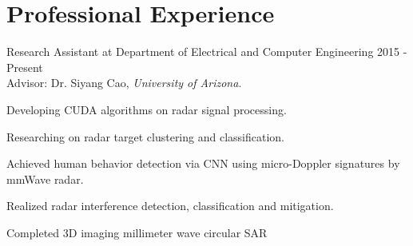 \documentclass[letterpaper,9pt]{article}
\renewenvironment{itemize}{
  \begin{list}{}{
    \setlength{\topsep}{0pt}
    \setlength{\itemsep}{0pt}
    \setlength{\parsep}{0pt}
    \setlength{\partopsep}{0pt}
    \setlength{\leftmargin}{1.5em}
  }
}{\end{list}}
\begin{document}
\section*{Professional Experience}
\begin{itemize}
  \setlength{\itemsep}{1em}
  \item Research Assistant at Department of Electrical and Computer Engineering \hfill 2015 - Present\\
Advisor: Dr. Siyang Cao, {\it University of Arizona}.
  \begin{itemize}
    \item [$\bullet$] Developing CUDA algorithms on radar signal processing.
    \item [$\bullet$] Researching on radar target clustering and classification.
    \item [$\bullet$] Achieved human behavior detection via CNN using micro-Doppler signatures by
  mmWave radar.
    \item [$\bullet$] Realized radar interference detection, classification and mitigation.

    \item [$\bullet$] Completed 3D imaging millimeter wave circular SAR
  \end{itemize}


\end{itemize}
\end{document}
